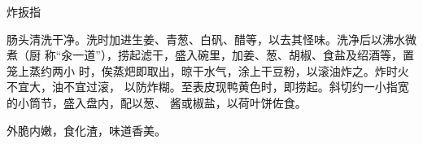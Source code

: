 %
%
%
%
%
%
%
\begin{recipe}{炸扳指}

\ingredients


\preparation

肠头清洗干净。洗时加进生姜、青葱、白矾、醋等，以去其怪味。洗净后以沸水微煮（厨
称“汆一道”），捞起滤干，盛入碗里，加姜、葱、胡椒、食盐及绍酒等，置笼上蒸约两小
时，俟蒸𤆵即取出，晾干水气，涂上干豆粉，以滚油炸之。炸时火不宜大，油不宜过滚，
以防炸糊。至表皮现鸭黄色时，即捞起。斜切约一小指宽的小筒节，盛入盘内，配以葱、
酱或椒盐，以荷叶饼佐食。

\features

外脆内嫩，食化渣，味道香美。

\end{recipe}

